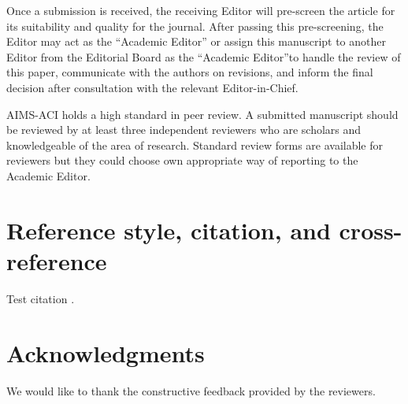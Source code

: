 \documentclass{aci}
\begin{document}
Once a submission is received, the receiving Editor will pre-screen the article
for its suitability and quality for the journal. After passing this
pre-screening, the Editor may act as the “Academic Editor” or assign this
manuscript to another Editor from the Editorial Board as the “Academic Editor”to
handle the review of this paper, communicate with the authors on revisions, and
inform the final decision after consultation with the relevant Editor-in-Chief.

AIMS-ACI holds a high standard in peer review. A submitted manuscript should be
reviewed by at least three independent reviewers who are scholars and
knowledgeable of the area of research. Standard review forms are available for
reviewers but they could choose own appropriate way of reporting to the Academic
Editor.


\section{Reference style, citation, and cross-reference}
Test citation \cite{ward_phylogeny_2014}.


\section*{Acknowledgments}
We would like to thank the constructive feedback provided by the reviewers.





\end{document}
